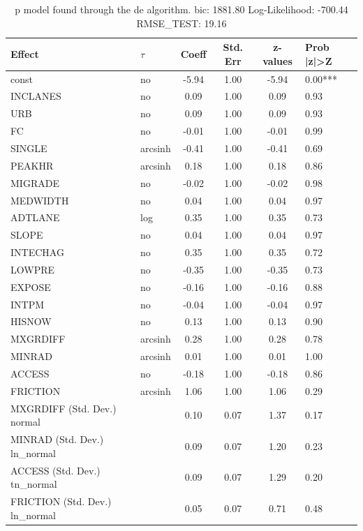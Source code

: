 \begin{table}
	\caption{p model found through the de algorithm. bic: 1881.80 Log-Likelihood: -700.44 RMSE_TEST: 19.16}
	\begin{center}
		\begin{tabular}{|l|l|c|c|c|l|}
			\hline
			Effect & $\tau$ & Coeff & Std. Err & z-values & Prob |z|>Z \\
			\hline
			const & no & -5.94 & 1.00 & -5.94 & 0.00*** \\
			\hline
			INCLANES & no & 0.09 & 1.00 & 0.09 & 0.93 \\
			\hline
			URB & no & 0.09 & 1.00 & 0.09 & 0.93 \\
			\hline
			FC & no & -0.01 & 1.00 & -0.01 & 0.99 \\
			\hline
			SINGLE & arcsinh & -0.41 & 1.00 & -0.41 & 0.69 \\
			\hline
			PEAKHR & arcsinh & 0.18 & 1.00 & 0.18 & 0.86 \\
			\hline
			MIGRADE & no & -0.02 & 1.00 & -0.02 & 0.98 \\
			\hline
			MEDWIDTH & no & 0.04 & 1.00 & 0.04 & 0.97 \\
			\hline
			ADTLANE & log & 0.35 & 1.00 & 0.35 & 0.73 \\
			\hline
			SLOPE & no & 0.04 & 1.00 & 0.04 & 0.97 \\
			\hline
			INTECHAG & no & 0.35 & 1.00 & 0.35 & 0.72 \\
			\hline
			LOWPRE & no & -0.35 & 1.00 & -0.35 & 0.73 \\
			\hline
			EXPOSE & no & -0.16 & 1.00 & -0.16 & 0.88 \\
			\hline
			INTPM & no & -0.04 & 1.00 & -0.04 & 0.97 \\
			\hline
			HISNOW & no & 0.13 & 1.00 & 0.13 & 0.90 \\
			\hline
			MXGRDIFF & arcsinh & 0.28 & 1.00 & 0.28 & 0.78 \\
			\hline
			MINRAD & arcsinh & 0.01 & 1.00 & 0.01 & 1.00 \\
			\hline
			ACCESS & no & -0.18 & 1.00 & -0.18 & 0.86 \\
			\hline
			FRICTION & arcsinh & 1.06 & 1.00 & 1.06 & 0.29 \\
			\hline
			MXGRDIFF (Std. Dev.) normal &  & 0.10 & 0.07 & 1.37 & 0.17 \\
			\hline
			MINRAD (Std. Dev.) ln_normal &  & 0.09 & 0.07 & 1.20 & 0.23 \\
			\hline
			ACCESS (Std. Dev.) tn_normal &  & 0.09 & 0.07 & 1.29 & 0.20 \\
			\hline
			FRICTION (Std. Dev.) ln_normal &  & 0.05 & 0.07 & 0.71 & 0.48 \\
			\hline
		\end{tabular}
	\end{center}
\end{table}